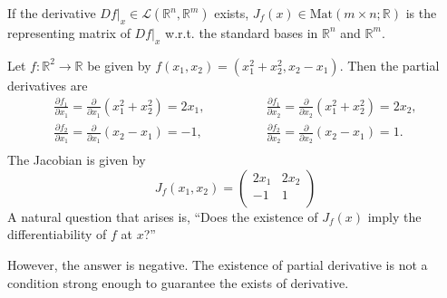 \documentclass[10pt]{article}
\newcommand{\R}{\mathbb{R}}
\renewcommand{\L}{\mathcal{L}}
\begin{document}
  \begin{remark}
    If the derivative $Df|_{x} \in \L(\R^{n},\R^{m})$ exists, $J_{f}(x) \in \text{Mat}(m \times n;\R)$ is the representing
    matrix of $Df|_{x}$ w.r.t. the standard bases in $\R^{n}$ and $\R^{m}$.
  \end{remark}

  \begin{example}
    Let $f:\R^{2} \to \R$ be given by $f(x_{1},x_{2}) = (x_{1}^{2}+x_{2}^{2},x_{2}-x_{1})$. Then the partial derivatives are
    \[
      \begin{aligned}
        \frac{\partial f_{1}}{\partial x_{1}} = \frac{\partial}{\partial x_{1}}(x_{1}^{2}+x_{2}^{2}) = 2x_{1},\\
        \frac{\partial f_{2}}{\partial x_{1}} = \frac{\partial}{\partial x_{1}}(x_{2}-x_{1}) = -1,\\
      \end{aligned}
      \qquad\qquad
      \begin{aligned}
        \frac{\partial f_{1}}{\partial x_{2}} = \frac{\partial}{\partial x_{2}}(x_{1}^{2}+x_{2}^{2}) = 2x_{2},\\
        \frac{\partial f_{2}}{\partial x_{2}} = \frac{\partial}{\partial x_{2}}(x_{2}-x_{1}) = 1.\\
      \end{aligned}
    \]
    The Jacobian is given by
    \[
      J_{f}(x_{1},x_{2}) = \begin{pmatrix}
        2x_{1} & 2x_{2} \\
        -1 & 1 \\
      \end{pmatrix}  
    \]
    A natural question that arises is, ``Does the existence of $J_{f}(x)$ imply the differentiability of $f$ at $x$?''
  \end{example}
  However, the answer is negative. The existence of partial derivative is not a condition strong enough to guarantee the exists of derivative.
\end{document}
